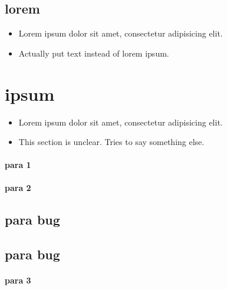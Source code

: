 \subsection{lorem}
\label{autosec:4}
    \begin{itemize}[noitemsep]
        \item Lorem ipsum dolor sit amet, consectetur adipisicing elit.
        \item {\color{red}Actually put text instead of lorem ipsum.}
    \end{itemize}
\section{ipsum}
\label{autosec:5}
    \begin{itemize}[noitemsep]
        \item Lorem ipsum dolor sit amet, consectetur adipisicing elit.
        \item {\color{OliveGreen}This section is unclear.}
{\color{OliveGreen}Tries to say something else.}
    \end{itemize}
\paragraph{para 1}
\label{autosec:6}
\paragraph{para 2}
\label{autosec:7}
\subsection{para bug}
\label{autosec:8}
\vspace{-36pt}\hspace{11pt}
\subsection{para bug}
\label{autosec:9}
\vspace{-36pt}\hspace{11pt}
\paragraph{para 3}
\label{autosec:10}

